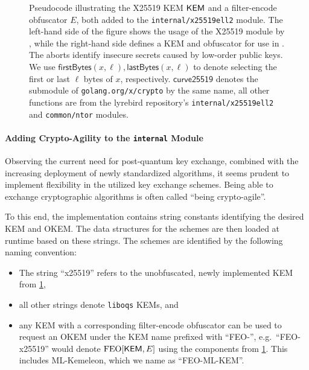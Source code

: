 \begin{figure}
    
    \caption[
        Pseudocode illustrating the X25519 KEM and filter-encode obfuscator added to the \texttt{internal/x25519ell2} module.
    ]{
        Pseudocode illustrating the X25519 KEM $\mathsf{KEM}$ and a filter-encode obfuscator $E$, both added to the \texttt{internal/x25519ell2} module.
        The left-hand side of the figure shows the usage of the X25519 module by \obfsfour{}, while the right-hand side defines a KEM and obfuscator for use in \drivel{}.
        The aborts identify insecure secrets caused by low-order public keys.
        We use $\mathsf{firstBytes}(x, \ell), \mathsf{lastBytes}(x, \ell)$ to denote selecting the first or last $\ell$ bytes of $x$, respectively.
        $\mathsf{curve25519}$ denotes the submodule of \texttt{golang.org/x/crypto} by the same name, all other functions are from the lyrebird repository's \texttt{internal/x25519ell2} and \texttt{common/ntor} modules.
    }
    \label{fig:impl-x25519-kem}
\end{figure}

\paragraph{Adding Crypto-Agility to the \texttt{internal} Module}

Observing the current need for post-quantum key exchange, combined with the increasing deployment of newly standardized algorithms, it seems prudent to implement flexibility in the utilized key exchange schemes. Being able to exchange cryptographic algorithms is often called ``being crypto-agile''.

To this end, the \drivel{} implementation contains string constants identifying the desired KEM and OKEM. The data structures for the schemes are then loaded at runtime based on these strings.
The schemes are identified by the following naming convention:
\begin{itemize}
    \item The string ``x25519'' refers to the unobfuscated, newly implemented KEM from \cref{fig:impl-x25519-kem},
    \item all other strings denote \texttt{liboqs} KEMs, and
    \item any KEM with a corresponding filter-encode obfuscator can be used to request an OKEM under the KEM name prefixed with ``FEO-'', e.g.~``FEO-x25519'' would denote $\textsf{\textnormal{FEO}}[\mathsf{KEM}, E]$ using the components from \cref{fig:impl-x25519-kem}. This includes ML-Kemeleon, which we name as ``FEO-ML-KEM''.
\end{itemize}

